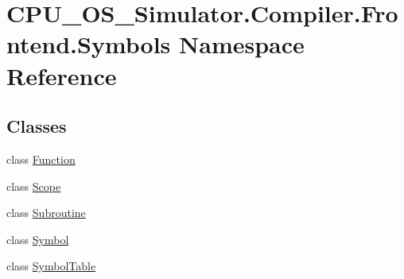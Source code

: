 \hypertarget{namespace_c_p_u___o_s___simulator_1_1_compiler_1_1_frontend_1_1_symbols}{}\section{C\+P\+U\+\_\+\+O\+S\+\_\+\+Simulator.\+Compiler.\+Frontend.\+Symbols Namespace Reference}
\label{namespace_c_p_u___o_s___simulator_1_1_compiler_1_1_frontend_1_1_symbols}
\subsection*{Classes}
\begin{DoxyCompactItemize}
\item 
class \hyperlink{class_c_p_u___o_s___simulator_1_1_compiler_1_1_frontend_1_1_symbols_1_1_function}{Function}
\item 
class \hyperlink{class_c_p_u___o_s___simulator_1_1_compiler_1_1_frontend_1_1_symbols_1_1_scope}{Scope}
\item 
class \hyperlink{class_c_p_u___o_s___simulator_1_1_compiler_1_1_frontend_1_1_symbols_1_1_subroutine}{Subroutine}
\item 
class \hyperlink{class_c_p_u___o_s___simulator_1_1_compiler_1_1_frontend_1_1_symbols_1_1_symbol}{Symbol}
\item 
class \hyperlink{class_c_p_u___o_s___simulator_1_1_compiler_1_1_frontend_1_1_symbols_1_1_symbol_table}{Symbol\+Table}
\end{DoxyCompactItemize}
